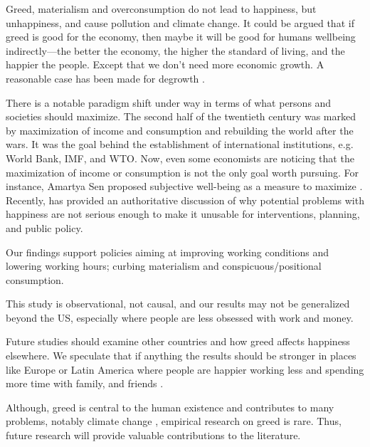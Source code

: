 \documentclass[10pt, letterpaper]{article}
\begin{document}
\begin{spacing}{1.8}
Greed, materialism and overconsumption do not lead to happiness, but unhappiness, and cause pollution and climate change\citep{leonard10,pachauri14}.
 It could be argued that if greed is good for the economy, then maybe it will be
 good for humans wellbeing indirectly---the better the economy, the higher the
 standard of living, and the happier the people. Except that we don't need more
 economic growth. A reasonable case has been made for degrowth \cite{kallis12,kallis11,bergh11}.
 
There is a notable paradigm shift under way in terms of what persons and
societies should maximize. The second half of the twentieth century was marked
by maximization of income and consumption and rebuilding the world after the
wars. It was the goal behind the establishment of international institutions,
e.g. World Bank, IMF, and WTO. Now, even some economists are noticing that the maximization of income or consumption is not the only goal worth pursuing. For instance, Amartya Sen proposed subjective well-being as a measure to maximize \cite{stiglitz09al}. 
Recently, \citet{diener09} has provided an authoritative  
discussion of why potential problems with happiness are not serious enough to make it unusable for interventions, planning, and public policy.  

Our findings support policies aiming at improving working conditions and lowering working hours; curbing materialism and conspicuous/positional consumption. 

This study is observational, not causal, and our results may not be generalized beyond the US, especially where people are less obsessed with work and money. 

Future studies should examine other countries and how greed affects happiness elsewhere. We speculate that if anything the results should be stronger in places like Europe or Latin America where people are happier working less and spending more time with family, and friends \citep{valente16,valente15,aokditella}.  

Although, greed is central to the human existence and contributes to many problems, notably climate change \citep[e.g.,][]{okulicz19}, empirical research on greed is rare. Thus, future research will provide valuable contributions to the literature. 



\end{spacing}
\end{document}
